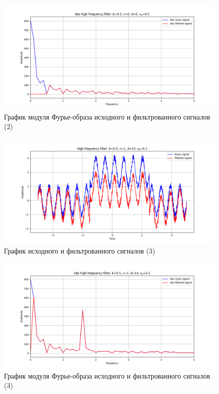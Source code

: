 \documentclass[a4paper, 12pt]{article}
\begin{document}
    \begin{figure}[H]
        \centering
        \includegraphics[scale=0.48]{2_abs_nolow.png}
        \captionsetup{skip=0pt}
        \caption{График модуля Фурье-образа исходного и фильтрованного сигналов (2)}
        \label{fig:fig30}
    \end{figure}
    \begin{figure}[H]
        \centering
        \includegraphics[scale=0.48]{3_nolow.png}
        \captionsetup{skip=0pt}
        \caption{График исходного и фильтрованного сигналов (3)}
        \label{fig:fig31}
    \end{figure}
    \begin{figure}[H]
        \centering
        \includegraphics[scale=0.48]{3_abs_nolow.png}
        \captionsetup{skip=0pt}
        \caption{График модуля Фурье-образа исходного и фильтрованного сигналов (3)}
        \label{fig:fig32}
    \end{figure}
\end{document}
